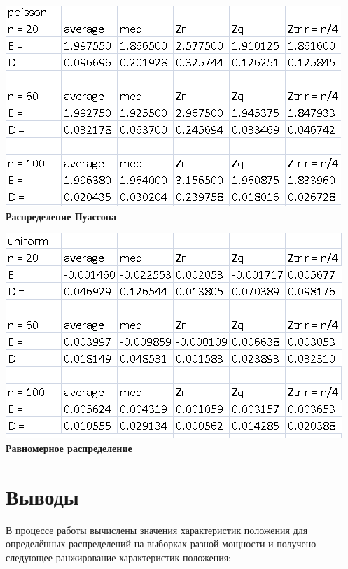 \documentclass[a4]{article}
\begin{document}
\begin{center}
\includegraphics[width=\textwidth]{poisson.png} \textbf{Распределение Пуассона }\\
\vspace{50pt}

\includegraphics[width=\textwidth]{uniform.png} \textbf{Равномерное распределение }\\

\end{center}

\section{Выводы}

\par В процессе работы вычислены значения характеристик положения для определённых распределений на выборках разной мощности и получено следующее ранжирование характеристик положения:
\end{document}
